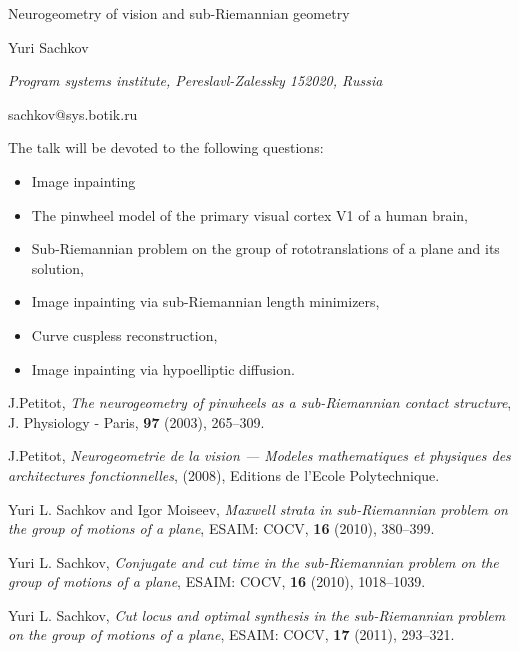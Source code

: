 \documentclass[10pt,a4paper]{article}
\begin{document}
\begin{center}

{\Large  Neurogeometry of vision and sub-Riemannian geometry}

\bigskip

{\sc Yuri Sachkov}

{\small\it Program systems institute, Pereslavl-Zalessky 152020,  Russia}

{\small\rm sachkov@sys.botik.ru}


\end{center}

\bigskip

The talk will be devoted to the following questions:
\begin{itemize}
\item 
Image inpainting
\item 
The pinwheel model of the primary visual cortex V1 of a human brain,
\item 
Sub-Riemannian problem on the group of rototranslations of a plane  and its solution,
\item 
Image inpainting via sub-Riemannian length minimizers,
\item 
Curve cuspless reconstruction,
\item 
Image inpainting via hypoelliptic diffusion.
\end{itemize}


\bigskip


%

\begin{thebibliography}{Sch26}

J.Petitot,
 \emph{The neurogeometry
	of pinwheels as a sub-Riemannian contact structure},
J. Physiology - Paris,    \textbf{97} (2003), 265--309.

J.Petitot,
 \emph{Neurogeometrie de la vision --- Modeles mathematiques et physiques des architectures fonctionnelles},
  (2008), Editions de l'Ecole Polytechnique. 


Yuri L. Sachkov and Igor Moiseev,
 \emph{Maxwell strata in sub-Riemannian problem  on the group of motions of a plane},
 ESAIM: COCV,    \textbf{16} (2010), 380--399.

Yuri L. Sachkov,
 \emph{Conjugate and cut time in the sub-Riemannian problem on the group of motions of a 
plane},
 ESAIM: COCV,    \textbf{16} (2010), 1018--1039.
 
Yuri L. Sachkov,
 \emph{Cut locus and optimal synthesis in the sub-Riemannian problem  on the group of motions of a 
plane},
 ESAIM: COCV,    \textbf{17} (2011), 293--321.
 

\end{thebibliography}
\end{document}
